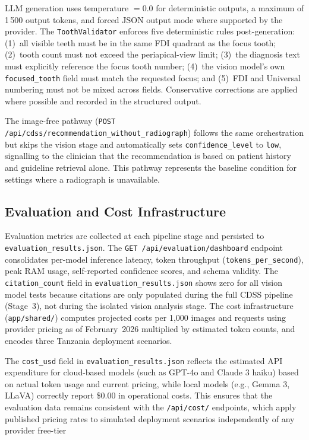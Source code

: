 \documentclass[12pt,a4paper]{report}
\begin{document}
	LLM generation uses temperature $= 0.0$ for deterministic outputs, a
	maximum of 1\,500 output tokens, and forced JSON output mode where
	supported by the provider.  The \texttt{ToothValidator} enforces five
	deterministic rules post-generation: (1)~all visible teeth must be in
	the same FDI quadrant as the focus tooth; (2)~tooth count must not
	exceed the periapical-view limit; (3)~the diagnosis text must
	explicitly reference the focus tooth number; (4)~the vision model's
	own \texttt{focused\_tooth} field must match the requested focus; and
	(5)~FDI and Universal numbering must not be mixed across fields.
	Conservative corrections are applied where possible and recorded in the
	structured output.
	
	The image-free pathway
	(\texttt{POST /api/cdss/recommendation\_without\_radiograph}) follows
	the same orchestration but skips the vision stage and automatically sets
	\texttt{confidence\_level} to \texttt{low}, signalling to the clinician
	that the recommendation is based on patient history and guideline
	retrieval alone.  This pathway represents the baseline condition for
	settings where a radiograph is unavailable.
	
	
	\subsection{Evaluation and Cost Infrastructure}
	\label{subsec:eval_infra}
	
	Evaluation metrics are collected at each pipeline stage and persisted
	to \texttt{evaluation\_results.json}. The
	\texttt{GET /api/evaluation/dashboard} endpoint consolidates per-model
	inference latency, token throughput (\texttt{tokens\_per\_second}), peak RAM
	usage,
	self-reported confidence scores, and schema validity. The
	\texttt{citation\_count}
	field in \texttt{evaluation\_results.json} shows zero for all vision model tests
	because citations are only populated during the full CDSS pipeline
	(Stage~3), not during the isolated vision analysis stage. The cost
	infrastructure (\texttt{app/shared/}) computes projected costs per 1,000 images
	and requests using provider pricing as of February~2026 multiplied by
	estimated token counts, and encodes three Tanzania deployment scenarios.
	
	The \texttt{cost\_usd} field in \texttt{evaluation\_results.json} reflects
	the estimated API expenditure for cloud-based models (such as GPT-4o and
	Claude 3 haiku) based on actual token usage and current pricing, while
	local models (e.g., Gemma 3, LLaVA) correctly report \$0.00 in operational
	costs. This ensures that the evaluation data remains consistent with the
	\texttt{/api/cost/} endpoints, which apply published pricing rates to
	simulated deployment scenarios independently of any provider free-tier
	
\end{document}

